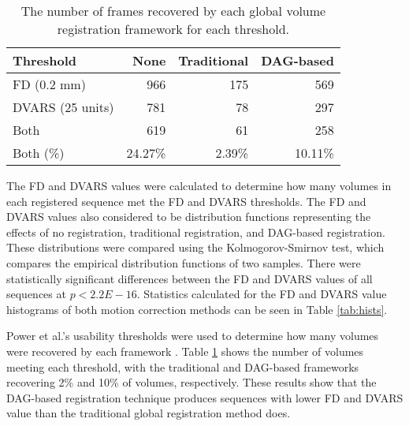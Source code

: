 \begin{table}[th]
\centering
\caption{The number of frames recovered by each global volume registration framework for each threshold.}
\label{tab:thresholds}
\begin{tabular}{|l|r|r|r|}
\hline
\textbf{Threshold} & \textbf{None} & \textbf{Traditional} & \textbf{DAG-based} \\ \hline
FD (0.2 mm)        & 966           & 175                  & 569                \\ \hline
DVARS (25 units)   & 781           & 78                   & 297                \\ \hline
Both               & 619           & 61                   & 258                \\ \hline
Both (\%)          & 24.27\%       & 2.39\%               & 10.11\%            \\ \hline
\end{tabular}
\end{table}


The FD and DVARS values were calculated to determine how many volumes in each registered sequence met the FD and DVARS thresholds. The FD and DVARS values also considered to be distribution functions representing the effects of no registration, traditional registration, and DAG-based registration. These distributions were compared using the Kolmogorov-Smirnov test, which compares the empirical distribution functions of two samples. There were statistically significant differences between the FD and DVARS values of all sequences at $p < 2.2E-16$. Statistics calculated for the FD and DVARS value histograms of both motion correction methods can be seen in Table \ref{tab:hists}.

Power et al.’s usability thresholds were used to determine how many volumes were recovered by each framework \cite{Power2014}. Table \ref{tab:thresholds} shows the number of volumes meeting each threshold, with the traditional and DAG-based frameworks recovering 2\% and 10\% of volumes, respectively. These results show that the DAG-based registration technique produces sequences with lower FD and DVARS value than the traditional global registration method does.
